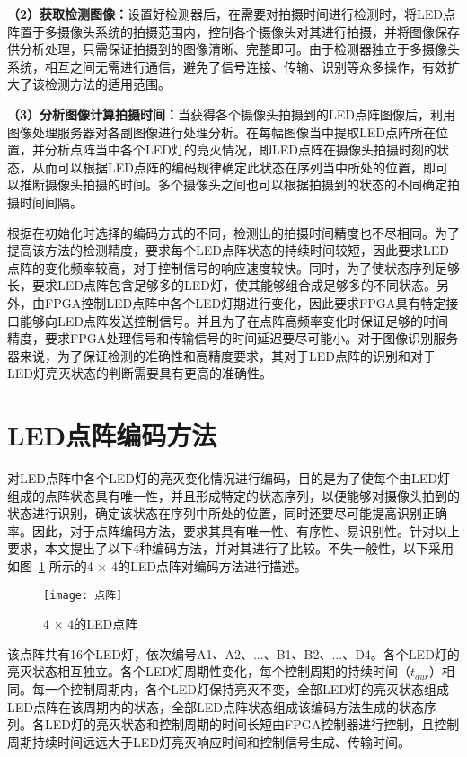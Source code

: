 \textbf{（2）获取检测图像：}设置好检测器后，在需要对拍摄时间进行检测时，将LED点阵置于多摄像头系统的拍摄范围内，控制各个摄像头对其进行拍摄，并将图像保存供分析处理，只需保证拍摄到的图像清晰、完整即可。由于检测器独立于多摄像头系统，相互之间无需进行通信，避免了信号连接、传输、识别等众多操作，有效扩大了该检测方法的适用范围。

\textbf{（3）分析图像计算拍摄时间：}当获得各个摄像头拍摄到的LED点阵图像后，利用图像处理服务器对各副图像进行处理分析。在每幅图像当中提取LED点阵所在位置，并分析点阵当中各个LED灯的亮灭情况，即LED点阵在摄像头拍摄时刻的状态，从而可以根据LED点阵的编码规律确定此状态在序列当中所处的位置，即可以推断摄像头拍摄的时间。多个摄像头之间也可以根据拍摄到的状态的不同确定拍摄时间间隔。

根据在初始化时选择的编码方式的不同，检测出的拍摄时间精度也不尽相同。为了提高该方法的检测精度，要求每个LED点阵状态的持续时间较短，因此要求LED点阵的变化频率较高，对于控制信号的响应速度较快。同时，为了使状态序列足够长，要求LED点阵包含足够多的LED灯，使其能够组合成足够多的不同状态。另外，由FPGA控制LED点阵中各个LED灯期进行变化，因此要求FPGA具有特定接口能够向LED点阵发送控制信号。并且为了在点阵高频率变化时保证足够的时间精度，要求FPGA处理信号和传输信号的时间延迟要尽可能小。对于图像识别服务器来说，为了保证检测的准确性和高精度要求，其对于LED点阵的识别和对于LED灯亮灭状态的判断需要具有更高的准确性。

\section{LED点阵编码方法}

对LED点阵中各个LED灯的亮灭变化情况进行编码，目的是为了使每个由LED灯组成的点阵状态具有唯一性，并且形成特定的状态序列，以便能够对摄像头拍到的状态进行识别，确定该状态在序列中所处的位置，同时还要尽可能提高识别正确率。因此，对于点阵编码方法，要求其具有唯一性、有序性、易识别性。针对以上要求，本文提出了以下4种编码方法，并对其进行了比较。不失一般性，以下采用如图~\ref{mat} 所示的4 × 4的LED点阵对编码方法进行描述。

\begin{figure}[h] 
  \centering
  \texttt{[image: 点阵]}
  \caption{4 × 4的LED点阵}
  \label{mat}
\end{figure}

该点阵共有16个LED灯，依次编号A1、A2、...、B1、B2、...、D4。各个LED灯的亮灭状态相互独立。各个LED灯周期性变化，每个控制周期的持续时间（$t_{dur}$）相同。每一个控制周期内，各个LED灯保持亮灭不变，全部LED灯的亮灭状态组成LED点阵在该周期内的状态，全部LED点阵状态组成该编码方法生成的状态序列。各LED灯的亮灭状态和控制周期的时间长短由FPGA控制器进行控制，且控制周期持续时间远远大于LED灯亮灭响应时间和控制信号生成、传输时间。

